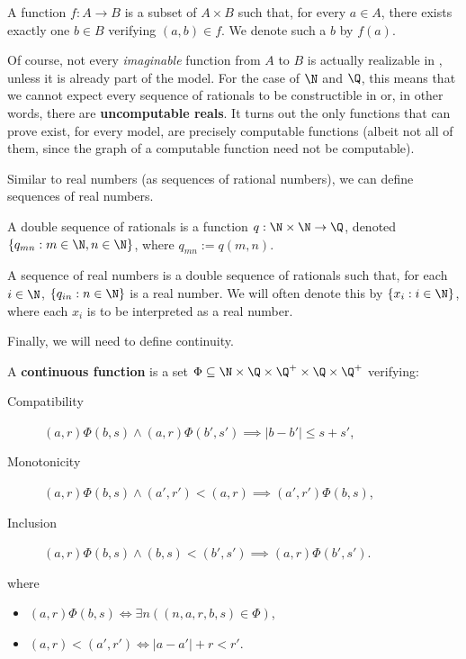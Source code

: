 \documentclass[../main.tex]{memoir}
\begin{document}
\begin{definition}
  \label{def:function}
  A function $f:A \to B$ is a subset of $A \times B$ such that, for every $a \in A$, there exists exactly one $b \in B$ verifying $(a, b) \in f$. We denote such a $b$ by $f(a)$.
\end{definition}

Of course, not every \textit{imaginable} function from $A$ to $B$ is actually realizable in \rca, unless it is already part of the model. For the case of $\N$ and $\Q$, this means that we cannot expect every sequence of rationals to be constructible in \rca or, in other words, there are \textbf{uncomputable reals}. It turns out the only functions that \rca can prove exist, for every model, are precisely computable functions (albeit not all of them, since the graph of a computable function need not be computable).

Similar to real numbers (as sequences of rational numbers), we can define sequences of real numbers.

\begin{definition}
  A double sequence of rationals is a function $q:\N \times \N \to \Q$, denoted $\{q_{mn}: m \in \N, n \in \N\}$, where $q_{mn} := q(m, n)$.

  A sequence of real numbers is a double sequence of rationals such that, for each $i \in \N$, $\{q_{in}: n \in \N\}$ is a real number. We will often denote this by $\{x_i: i \in \N\}$, where each $x_i$ is to be interpreted as a real number.
\end{definition}

Finally, we will need to define continuity.

\begin{definition}
  \label{def:continuous-function-rca}
  A \textbf{continuous function} is a set $\Phi \subseteq \N \times \Q \times \Q^+ \times \Q \times \Q^+$ verifying:

  \begin{description}
  \item[Compatibility] $(a, r)\Phi(b, s) \land (a, r)\Phi(b', s') \implies |b - b'| \le s + s'$,
  \item[Monotonicity] $(a, r)\Phi(b, s) \land (a', r') < (a, r) \implies (a', r')\Phi(b, s)$,
  \item[Inclusion] $(a, r)\Phi(b, s) \land (b, s) < (b', s') \implies (a, r)\Phi(b', s')$.
  \end{description}

  where

  \begin{itemize}
  \item $(a, r)\Phi(b, s) \iff \exists n ((n, a, r, b, s) \in \Phi)$,
  \item $(a, r) < (a', r') \iff |a - a'| + r < r'$.
  \end{itemize}
\end{definition}
\end{document}
